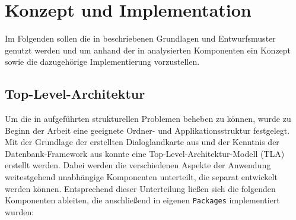 \chapter{Konzept und Implementation}\label{ch:konzept}

Im Folgenden sollen die in  beschriebenen Grundlagen und Entwurfsmuster genutzt werden und um anhand der in  analysierten Komponenten ein Konzept sowie die dazugehörige Implementierung vorzustellen.

\section{Top-Level-Architektur}

Um die in  aufgeführten strukturellen Problemen beheben zu können, wurde zu Beginn der Arbeit eine geeignete Ordner- und Applikationsstruktur festgelegt. Mit der Grundlage der erstellten Dialoglandkarte aus  und der Kenntnis der Datenbank-Framework aus  konnte eine Top-Level-Architektur-Modell (TLA) erstellt werden. Dabei werden die verschiedenen Aspekte der Anwendung weitestgehend unabhängige Komponenten unterteilt, die separat entwickelt werden können. Entsprechend dieser Unterteilung ließen sich die folgenden Komponenten ableiten, die anschließend in eigenen \texttt{Packages} implementiert wurden:

